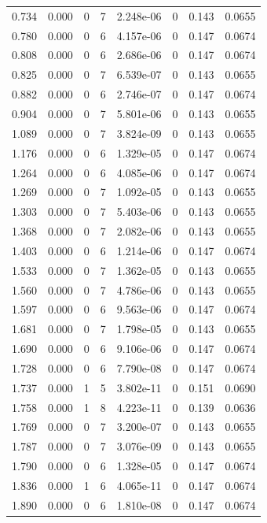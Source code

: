 \documentclass[preview]{standalone}
\begin{document}
{{\begin{tabular}{L{1.2cm}C{1.2cm} C{0.3cm}C{0.5cm} C{1.4cm}C{1.4cm} C{1.4cm}C{1.4cm}}
  0.734  &  0.000  & 0     &  7 &  2.248e-06  & 0  & 0.143 &  0.0655   \\ 
  0.780  &  0.000  & 0     &  6 &  4.157e-06  & 0  & 0.147 &  0.0674   \\ 
  0.808  &  0.000  & 0     &  6 &  2.686e-06  & 0  & 0.147 &  0.0674   \\ 
  0.825  &  0.000  & 0     &  7 &  6.539e-07  & 0  & 0.143 &  0.0655   \\ 
  0.882  &  0.000  & 0     &  6 &  2.746e-07  & 0  & 0.147 &  0.0674   \\ 
  0.904  &  0.000  & 0     &  7 &  5.801e-06  & 0  & 0.143 &  0.0655   \\ 
  1.089  &  0.000  & 0     &  7 &  3.824e-09  & 0  & 0.143 &  0.0655   \\ 
  1.176  &  0.000  & 0     &  6 &  1.329e-05  & 0  & 0.147 &  0.0674   \\ 
  1.264  &  0.000  & 0     &  6 &  4.085e-06  & 0  & 0.147 &  0.0674   \\ 
  1.269  &  0.000  & 0     &  7 &  1.092e-05  & 0  & 0.143 &  0.0655   \\ 
  1.303  &  0.000  & 0     &  7 &  5.403e-06  & 0  & 0.143 &  0.0655   \\ 
  1.368  &  0.000  & 0     &  7 &  2.082e-06  & 0  & 0.143 &  0.0655   \\ 
  1.403  &  0.000  & 0     &  6 &  1.214e-06  & 0  & 0.147 &  0.0674   \\ 
  1.533  &  0.000  & 0     &  7 &  1.362e-05  & 0  & 0.143 &  0.0655   \\ 
  1.560  &  0.000  & 0     &  7 &  4.786e-06  & 0  & 0.143 &  0.0655   \\ 
  1.597  &  0.000  & 0     &  6 &  9.563e-06  & 0  & 0.147 &  0.0674   \\ 
  1.681  &  0.000  & 0     &  7 &  1.798e-05  & 0  & 0.143 &  0.0655   \\ 
  1.690  &  0.000  & 0     &  6 &  9.106e-06  & 0  & 0.147 &  0.0674   \\ 
  1.728  &  0.000  & 0     &  6 &  7.790e-08  & 0  & 0.147 &  0.0674   \\ 
  1.737  &  0.000  & 1     &  5 &  3.802e-11  & 0  & 0.151 &  0.0690   \\ 
  1.758  &  0.000  & 1     &  8 &  4.223e-11  & 0  & 0.139 &  0.0636   \\ 
  1.769  &  0.000  & 0     &  7 &  3.200e-07  & 0  & 0.143 &  0.0655   \\ 
  1.787  &  0.000  & 0     &  7 &  3.076e-09  & 0  & 0.143 &  0.0655   \\ 
  1.790  &  0.000  & 0     &  6 &  1.328e-05  & 0  & 0.147 &  0.0674   \\ 
  1.836  &  0.000  & 1     &  6 &  4.065e-11  & 0  & 0.147 &  0.0674   \\ 
  1.890  &  0.000  & 0     &  6 &  1.810e-08  & 0  & 0.147 &  0.0674   \\ 
\hline 
\end{tabular} 

}}
\end{document}
